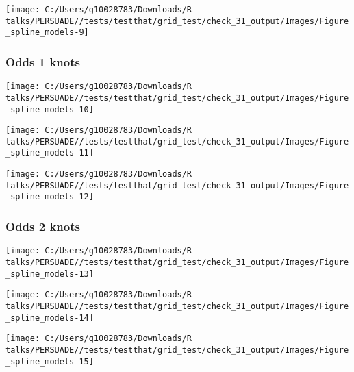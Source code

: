 \documentclass[
]{article}
\begin{document}
\begin{flushleft}\texttt{[image: C:/Users/g10028783/Downloads/R talks/PERSUADE//tests/testthat/grid\_test/check\_31\_output/Images/Figure\_spline\_models-9]} \end{flushleft}

\clearpage

\subsubsection{Odds 1 knots}\label{odds-1-knots}

\begin{flushleft}\texttt{[image: C:/Users/g10028783/Downloads/R talks/PERSUADE//tests/testthat/grid\_test/check\_31\_output/Images/Figure\_spline\_models-10]} \end{flushleft}

\begin{flushleft}\texttt{[image: C:/Users/g10028783/Downloads/R talks/PERSUADE//tests/testthat/grid\_test/check\_31\_output/Images/Figure\_spline\_models-11]} \end{flushleft}

\begin{flushleft}\texttt{[image: C:/Users/g10028783/Downloads/R talks/PERSUADE//tests/testthat/grid\_test/check\_31\_output/Images/Figure\_spline\_models-12]} \end{flushleft}

\clearpage

\subsubsection{Odds 2 knots}\label{odds-2-knots}

\begin{flushleft}\texttt{[image: C:/Users/g10028783/Downloads/R talks/PERSUADE//tests/testthat/grid\_test/check\_31\_output/Images/Figure\_spline\_models-13]} \end{flushleft}

\begin{flushleft}\texttt{[image: C:/Users/g10028783/Downloads/R talks/PERSUADE//tests/testthat/grid\_test/check\_31\_output/Images/Figure\_spline\_models-14]} \end{flushleft}

\begin{flushleft}\texttt{[image: C:/Users/g10028783/Downloads/R talks/PERSUADE//tests/testthat/grid\_test/check\_31\_output/Images/Figure\_spline\_models-15]} \end{flushleft}
\end{document}
